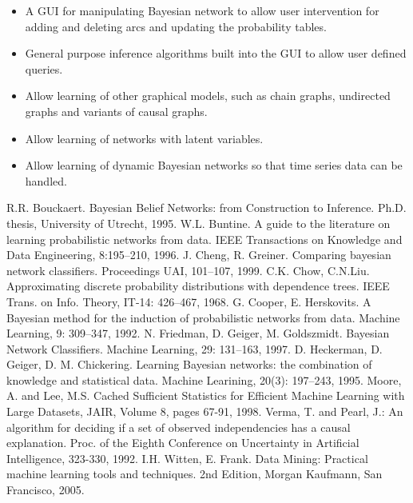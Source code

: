\documentclass[a4paper]{article}
\begin{document}
\begin{itemize}
\item A GUI for manipulating Bayesian network to allow user intervention for
adding and deleting arcs and updating the probability tables.

\item General purpose inference algorithms built into the GUI to allow user
defined queries.

\item Allow learning of other graphical models, such as chain graphs,
undirected graphs and variants of causal graphs.

\item Allow learning of networks with latent variables.

\item Allow learning of dynamic Bayesian networks so that time series data
can be handled.
\end{itemize}



\begin{thebibliography}{1}
	R.R. Bouckaert. Bayesian Belief Networks: from Construction to Inference. 
	Ph.D. thesis, 
	University of Utrecht, 
	1995.
        W.L. Buntine. A guide to the literature on learning probabilistic networks from data. 
	IEEE Transactions on Knowledge and Data Engineering, 8:195--210, 
	1996. 
	J. Cheng, R. Greiner. 
	Comparing bayesian network classifiers. 
	Proceedings UAI,
	101--107,
	1999.
	C.K. Chow, C.N.Liu.
	Approximating discrete probability distributions with dependence trees.
	IEEE Trans. on Info. Theory, IT-14: 426--467, 1968.
	G. Cooper, E. Herskovits. 
	A Bayesian method for the induction of probabilistic networks from data. 
	Machine Learning, 9: 309--347, 1992.
	N. Friedman, D. Geiger, M. Goldszmidt. 
	Bayesian Network Classifiers. 
	Machine Learning, 29: 131--163, 1997.
	D. Heckerman, D. Geiger, D. M. Chickering. 
	Learning Bayesian networks: the combination of knowledge and statistical data. 
	Machine Learining, 20(3): 197--243, 1995.
  Moore, A. and Lee, M.S. Cached Sufficient Statistics for Efficient Machine Learning with Large Datasets,
  JAIR, 
  Volume 8, pages 67-91, 1998. 
  Verma, T. and Pearl, J.: 
  An algorithm for deciding if a set of observed independencies has a causal explanation. 
  Proc. of the Eighth Conference on Uncertainty in Artificial Intelligence, 
  323-330, 
1992.
  I.H. Witten, E. Frank.
  Data Mining: Practical machine learning tools and techniques.
  2nd Edition, Morgan Kaufmann, San Francisco, 2005.
\end{thebibliography}
\end{document}
